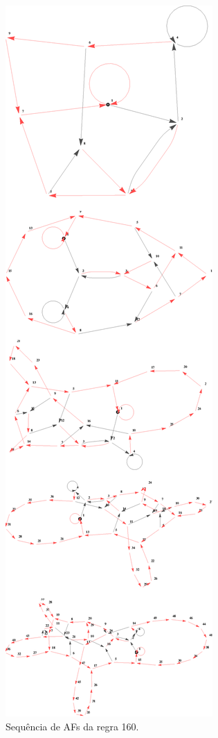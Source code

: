 \documentclass[12pt,a4paper]{article}
\begin{document}
\begin{figure}[H]
\begin{center}
\includegraphics[scale=0.49]{img/Rule160dfa.eps}
\caption{Sequência de AFs da regra 160.}
\label{fig:r160ta}
\end{center}
\end{figure}
\end{document}
